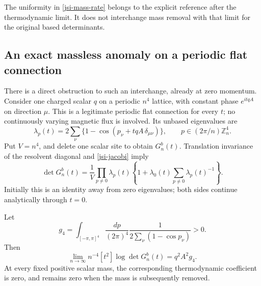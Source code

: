 The uniformity in \eqref{jsi-mass-rate} belongs to the explicit
reference after the thermodynamic limit. It does not interchange
mass removal with that limit for the original based determinants.

\subsection{An exact massless anomaly on a periodic flat connection}
\label{jsi-anomaly-section}

There is a direct obstruction to such an interchange, already
at zero momentum. Consider one charged scalar \(q\) on a periodic
\(n^4\) lattice, with constant phase \(e^{itqA}\) on direction
\(\mu\). This is a legitimate periodic flat connection for every
\(t\); no continuously varying magnetic flux is involved.
Its unbased eigenvalues are
\begin{equation}
 \lambda_p(t)=2\sum_\nu
       \{1-\cos(p_\nu+tqA\,\delta_{\mu\nu})\},
       \qquad p\in(2\pi/n)\mathbb Z_n^4.
 \label{jsi-spectrum}
\end{equation}
Put \(V=n^4\), and delete one scalar site to obtain \(G_n^b(t)\).
Translation invariance of the resolvent diagonal and
\eqref{jsi-jacobi} imply
\begin{equation}
 \det G_n^b(t)=\frac1V\prod_{p\ne0}\lambda_p(t)
       \left\{1+\lambda_0(t)
                    \sum_{p\ne0}\lambda_p(t)^{-1}\right\}.
 \label{jsi-cofactor}
\end{equation}
Initially this is an identity away from zero eigenvalues;
both sides continue analytically through \(t=0\).

\begin{proposition}
\label{jsi-anomaly-theorem}
Let
\begin{equation}
 g_4=\int_{[-\pi,\pi]^4}\frac{dp}{(2\pi)^4}
             \frac1{2\sum_\nu(1-\cos p_\nu)}>0.
 \label{jsi-green}
\end{equation}
Then
\begin{equation}
 \lim_{n\to\infty}n^{-4}[t^2]\log\det G_n^b(t)
                           =q^2A^2g_4.
 \label{jsi-anomaly}
\end{equation}
At every fixed positive scalar mass, the corresponding
thermodynamic coefficient is zero, and remains zero when
the mass is subsequently removed.
\end{proposition}

